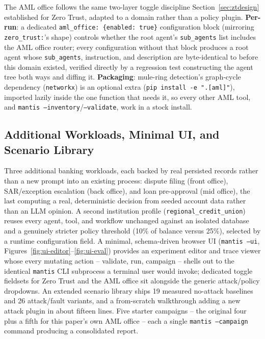 \documentclass[conference]{IEEEtran}
\begin{document}
The AML office follows the same two-layer toggle discipline Section~\ref{sec:ztdesign} established for Zero Trust, adapted to a domain rather than a policy plugin. \textbf{Per-run}: a dedicated \texttt{aml\_office: \{enabled: true\}} configuration block (mirroring \texttt{zero\_trust:}'s shape) controls whether the root agent's \texttt{sub\_agents} list includes the AML office router; every configuration without that block produces a root agent whose \texttt{sub\_agents}, instruction, and description are byte-identical to before this domain existed, verified directly by a regression test constructing the agent tree both ways and diffing it. \textbf{Packaging}: mule-ring detection's graph-cycle dependency (\texttt{networkx}) is an optional extra (\texttt{pip install -e ".[aml]"}), imported lazily inside the one function that needs it, so every other AML tool, and \texttt{mantis --inventory}/\texttt{--validate}, work in a stock install.

\subsection{Additional Workloads, Minimal UI, and Scenario Library}
\label{sec:workloads}

Three additional banking workloads, each backed by real persisted records rather than a new prompt into an existing process: dispute filing (front office), SAR/exception escalation (back office), and loan pre-approval (mid office), the last computing a real, deterministic decision from seeded account data rather than an LLM opinion. A second institution profile (\texttt{regional\_credit\_union}) reuses every agent, tool, and workflow unchanged against an isolated database and a genuinely stricter policy threshold (10\% of balance versus 25\%), selected by a runtime configuration field. A minimal, schema-driven browser UI (\texttt{mantis --ui}, Figures~\ref{fig:ui-editor}--\ref{fig:ui-eval}) provides an experiment editor and trace viewer whose every mutating action -- validate, run, campaign -- shells out to the identical \texttt{mantis} CLI subprocess a terminal user would invoke; dedicated toggle fieldsets for Zero Trust and the AML office sit alongside the generic attack/policy dropdowns. An extended scenario library ships 19 measured no-attack baselines and 26 attack/fault variants, and a from-scratch walkthrough adding a new attack plugin in about fifteen lines. Five starter campaigns -- the original four~\cite{mantis_paper2} plus a fifth for this paper's own AML office -- each a single \texttt{mantis --campaign} command producing a consolidated report.
\end{document}

